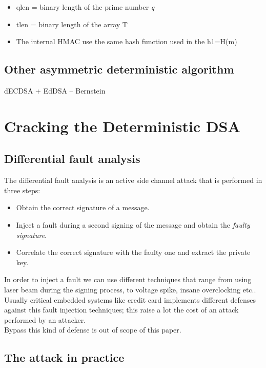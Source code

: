 \documentclass[11pt,english]{article}
\begin{document}
\begin{itemize}
\item qlen = binary length of the prime number \textit{q}
\item tlen = binary length of the array T 
\item The internal HMAC use the same hash function used in the h1=H(m)
\end{itemize}

\subsection{Other asymmetric deterministic algorithm}

dECDSA  + EdDSA -- Bernstein

\section{Cracking the Deterministic DSA}

\subsection{Differential fault analysis}

The differential fault analysis is an active side channel attack that is performed in three steps:
\begin{itemize}
\item Obtain the correct signature of a message.
\item Inject a fault during a second signing of the message and obtain the \textit{faulty signature}.
\item Correlate the correct signature with the faulty one and extract the private key.
\end{itemize}

In order to inject a fault we can use different techniques that range from using laser beam during the signing process, to voltage spike, insane overclocking etc..
\\Usually critical embedded systems like credit card implements different defenses against this fault injection techniques; this raise a lot the cost of an attack performed by an attacker. \\Bypass this kind of defense is out of scope of this paper.

\subsection{The attack in practice}
\end{document}
